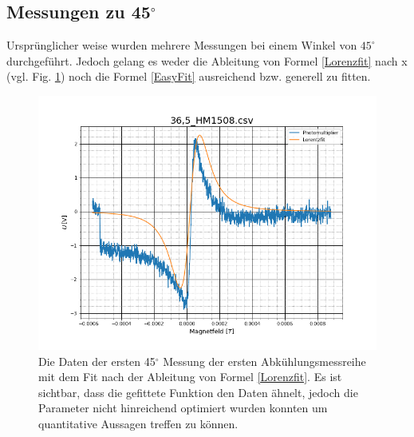 \subsection{Messungen zu 45$^\circ$}
Ursprünglicher weise wurden mehrere Messungen bei einem Winkel von $45^\circ$ durchgeführt. Jedoch gelang es weder die Ableitung von Formel \ref{Lorenzfit} nach x (vgl. Fig. \ref{45deg}) noch die Formel \ref{EasyFit} ausreichend bzw. generell zu fitten. 
\begin{figure}[ht]
	\includegraphics[scale=0.5]{Bild/45_fit}
	\centering
	\caption[Druck zu Lebensdauer Fit für eine Beliebige 45$\circ$ Messung]{Die Daten der ersten 45$^\circ$ Messung der ersten Abkühlungsmessreihe mit dem Fit nach der Ableitung von Formel \ref{Lorenzfit}. Es ist sichtbar, dass die gefittete Funktion den Daten ähnelt, jedoch die Parameter nicht hinreichend optimiert wurden konnten um quantitative Aussagen treffen zu können.}
	\label{45deg}
\end{figure}